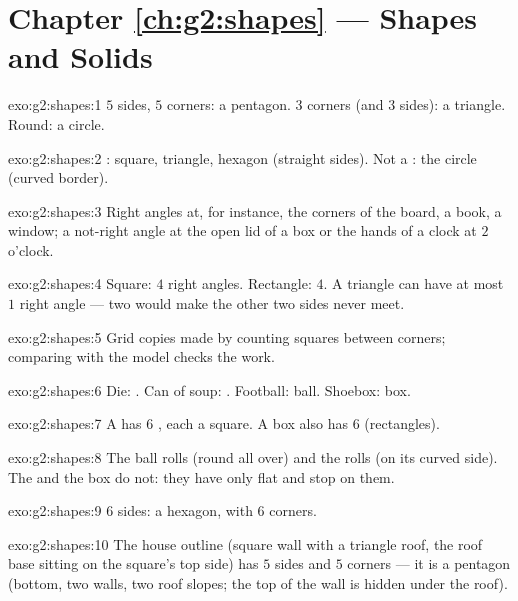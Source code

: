 \section*{Chapter \ref{ch:g2:shapes} --- Shapes and Solids}

\begin{solution}{exo:g2:shapes:1}
$5$ sides, $5$ corners: a pentagon. $3$ corners (and $3$ sides): a
triangle. Round: a circle.
\end{solution}

\begin{solution}{exo:g2:shapes:2}
: square, triangle, hexagon (straight sides). Not a
: the circle (curved border).
\end{solution}

\begin{solution}{exo:g2:shapes:3}
Right angles at, for instance, the corners of the board, a book, a
window; a not-right angle at the open lid of a box or the hands of
a clock at $2$ o'clock.
\end{solution}

\begin{solution}{exo:g2:shapes:4}
Square: $4$ right angles. Rectangle: $4$. A triangle can have at
most $1$ right angle --- two would make the other two sides never
meet.
\end{solution}

\begin{solution}{exo:g2:shapes:5}
Grid copies made by counting squares between corners; comparing
with the model checks the work.
\end{solution}

\begin{solution}{exo:g2:shapes:6}
Die: . Can of soup: . Football: ball. Shoebox: box.
\end{solution}

\begin{solution}{exo:g2:shapes:7}
A  has $6$ , each a square. A box also has $6$ 
(rectangles).
\end{solution}

\begin{solution}{exo:g2:shapes:8}
The ball rolls (round all over) and the  rolls (on its
curved side). The  and the box do not: they have only flat
 and stop on them.
\end{solution}

\begin{solution}{exo:g2:shapes:9}
$6$ sides: a hexagon, with $6$ corners.
\end{solution}

\begin{solution}{exo:g2:shapes:10}
The house outline (square wall with a triangle roof, the roof base
sitting on the square's top side) has $5$ sides and $5$ corners ---
it is a pentagon (bottom, two walls, two roof slopes; the top of
the wall is hidden under the roof).
\end{solution}
